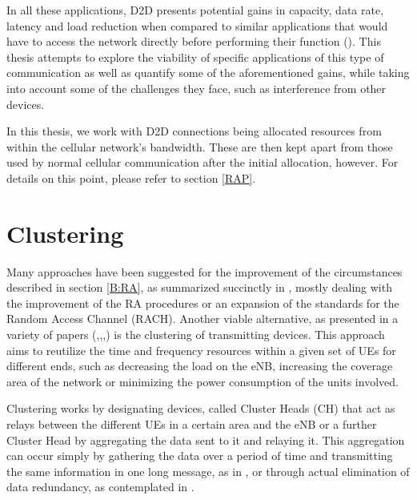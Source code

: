 In all these applications, D2D presents potential gains in capacity, data rate, latency and load reduction when compared to similar applications that would have to access the network directly before performing their function (\cite{6163598}). This thesis attempts to explore the viability of specific applications of this type of communication as well as quantify some of the aforementioned gains, while taking into account some of the challenges they face, such as interference from other devices.

In this thesis, we work with D2D connections being allocated resources from within the cellular network's bandwidth. These are then kept apart from those used by normal cellular communication after the initial allocation, however. For details on this point, please refer to section \ref{RAP}.

\section{Clustering}\label{B:Cl}

Many approaches have been suggested for the improvement of the circumstances described in section \ref{B:RA}, as summarized succinctly in \cite{Laya2014}, mostly dealing with the improvement of the RA procedures or an expansion of the standards for the Random Access Channel (RACH). Another viable alternative, as presented in a variety of papers (\cite{Wei2012a},\cite{Laya2014a},\cite{Wang2013},\cite{Liao2013}) is the clustering of transmitting devices. This approach aims to reutilize the time and frequency resources within a given set of UEs for different ends, such as decreasing the load on the eNB, increasing the coverage area of the network or minimizing the power consumption of the units involved.

Clustering works by designating devices, called Cluster Heads (CH) that act as relays between the different UEs in a certain area and the eNB or a further Cluster Head by aggregating the data sent to it and relaying it. This aggregation can occur simply by gathering the data over a period of time and transmitting the same information in one long message, as in \cite{Shariatmadari2015}, or through actual elimination of data redundancy, as contemplated in \cite{Riker2015}.

